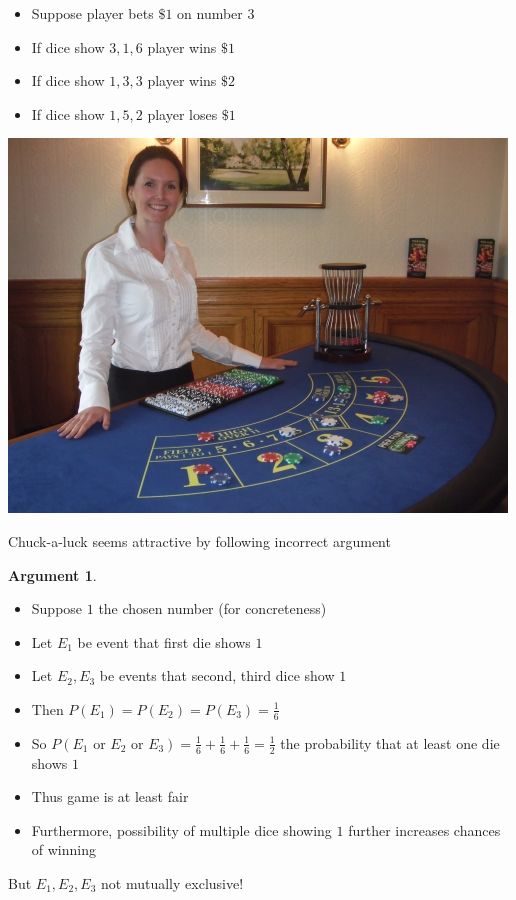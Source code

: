 \documentclass[handout]{beamer}
\theoremstyle{definition}
\newtheorem{argument}{Argument}
\begin{document}
\begin{frame}
\begin{example}
\begin{itemize}
\item Suppose player bets $\$1$ on number $3$
\item If dice show $3,1,6$ player wins $\$1$
\item If dice show $1,3,3$ player wins $\$2$
\item If dice show $1,5,2$ player loses $\$1$
\end{itemize}
\end{example}
\begin{center}\includegraphics[scale=.35]{Chuck2}\end{center}
\end{frame}

\begin{frame}
Chuck-a-luck seems attractive by following \alert{incorrect} argument
\begin{argument}
\begin{itemize}
\item Suppose $1$ the chosen number (for concreteness)
\item Let $E_1$ be event that first die shows $1$
\item Let $E_2,E_3$ be events that second, third dice show $1$
\item Then $P\left(E_1\right)=P\left(E_2\right)=P\left(E_3\right)
=\frac{1}{6}$
\item So $P\left(\text{$E_1$ or $E_2$ or $E_3$}\right)
=\frac{1}{6}+\frac{1}{6}+\frac{1}{6}=\frac{1}{2}$
the probability that at least one die shows $1$
\item Thus game is at least fair
\item Furthermore, possibility of \alert{multiple} dice
showing $1$ further increases chances of winning
\end{itemize}
\end{argument}
But $E_1,E_2,E_3$ \alert{not mutually exclusive}!
\end{frame}
\end{document}

